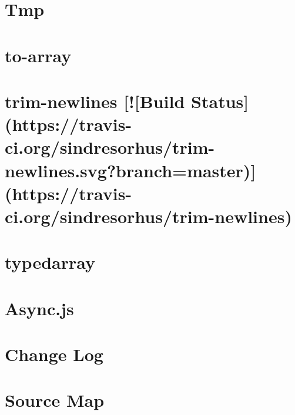 \documentclass[twoside]{book}
\newcommand{\+}{\discretionary{\mbox{\scriptsize$\hookleftarrow$}}{}{}}
\begin{document}
\chapter{Tmp}
\label{md_app_web_node_modules_tmp__r_e_a_d_m_e}

\chapter{to-\/array}
\label{md_app_web_node_modules_to-array__r_e_a_d_m_e}

\chapter{trim-\/newlines \mbox{[}!\mbox{[}Build Status\mbox{]}(https\+://travis-\/ci.org/sindresorhus/trim-\/newlines.svg?branch=master)\mbox{]}(https\+://travis-\/ci.org/sindresorhus/trim-\/newlines)}
\label{md_app_web_node_modules_trim-newlines_readme}

\chapter{typedarray}
\label{md_app_web_node_modules_typedarray_readme}

\chapter{Async.\+js}
\label{md_app_web_node_modules_uglify-js_node_modules_async__r_e_a_d_m_e}

\chapter{Change Log}
\label{md_app_web_node_modules_uglify-js_node_modules_source-map__c_h_a_n_g_e_l_o_g}

\chapter{Source Map}
\label{md_app_web_node_modules_uglify-js_node_modules_source-map__r_e_a_d_m_e}

\end{document}
